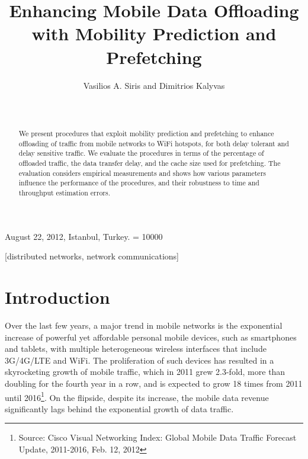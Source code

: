 \documentclass{sig-alternate}
\begin{document}
 {August 22, 2012, Istanbul, Turkey.}
\widowpenalty = 10000


\title{Enhancing Mobile Data Offloading with Mobility Prediction and Prefetching
}



\author{
\alignauthor
Vasilios A. Siris and Dimitrios Kalyvas \\
 \\
 \\
}


\maketitle
\begin{abstract}
We present procedures that exploit mobility prediction and prefetching to enhance  offloading of traffic from mobile networks to WiFi hotspots,
for both delay tolerant and delay sensitive traffic.
 We evaluate the  procedures in terms of the percentage of offloaded traffic, the data transfer delay, and the cache size used for prefetching. The evaluation considers empirical measurements and
 shows how various parameters influence the performance of the procedures, and their robustness to time and throughput estimation errors.
\end{abstract}

[distributed networks, network communications]




\section{Introduction}

Over the last few years, a major trend in mobile networks is the exponential increase of powerful yet affordable personal mobile devices, such as smartphones and tablets, with multiple heterogeneous wireless interfaces that include 3G/4G/LTE and WiFi. The proliferation of such  devices has resulted in a skyrocketing growth of mobile traffic, which in 2011 grew 2.3-fold, more than doubling   for the fourth year in a row, and is expected to grow 18 times from 2011 until 2016\footnote{Source: Cisco Visual Networking Index: Global Mobile Data Traffic Forecast Update, 2011-2016, Feb. 12, 2012}. On the flipside, despite its increase, the mobile data revenue significantly lags behind the exponential growth of data traffic.
\end{document}
